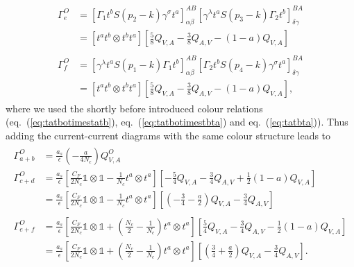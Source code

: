 \begin{align}
		\begin{split}
			\Gamma^O_e &= \left[ \Gamma_1 t^b S(p_2-k) \gamma^\sigma t^a \right]^{AB}_{\alpha\beta} \left[ \gamma^\lambda t^a S(p_3 -k) \Gamma_2 t^b \right]^{BA}_{\delta\gamma} \\
			&= \left[ t^a t^b \otimes t^b t^a \right] \left[\frac{5}{8}Q_{V,A} - \frac{3}{8}Q_{A,V} - (1-a)Q_{V,A}\right] 
		\end{split} \\
		\begin{split}
			\Gamma^O_f &= \left[\gamma^\lambda t^a S(p_1-k) \Gamma_1 t^b \right]^{AB}_{\alpha\beta} \left[ \Gamma_2 t^b S(p_4-k) \gamma^\sigma t^a \right]^{BA}_{\delta\gamma} \\
			&= \left[ t^a t^b \otimes t^b t^a \right] \left[\frac{5}{8}Q_{V,A} - \frac{3}{8}Q_{A,V} - (1-a)Q_{V,A}\right], 
		\end{split} 
	\end{align}
	where we used the shortly before introduced colour relations (eq.~(\ref{eq:tatbotimestatb}), eq.~(\ref{eq:tatbotimestbta}) and eq.~(\ref{eq:tatbta})). Thus adding the current-current diagrams with the same colour structure leads to 
	\begin{align}
		\begin{split}
			\Gamma^O_{a+b} &= \frac{a_s}{\epsilon} \left(-\frac{a}{4N_c}\right) Q^O_{V,A} \\
			\Gamma^O_{c+d} &= \frac{a_s}{\epsilon}\left[\frac{C_F}{2N_c}\mathbb{1}\otimes\mathbb{1} - \frac{1}{N_c}t^a\otimes t^a\right] \left[-\frac{5}{4}Q_{V,A} - \frac{3}{4} Q_{A,V} + \frac{1}{2}(1-a)Q_{V,A} \right] \\
			&= \frac{a_s}{\epsilon} \left[\frac{C_F}{2N_c}\mathbb{1}\otimes\mathbb{1} - \frac{1}{N_c}t^a\otimes t^a\right] \left[\left(-\frac{3}{4}-\frac{a}{2}\right)Q_{V,A} - \frac{3}{4} Q_{A,V} \right] 
		\end{split} \\
		\begin{split}	
			\Gamma^O_{e+f} &= \frac{a_s}{\epsilon} \left[\frac{C_F}{2N_c} \mathbb{1}\otimes\mathbb{1} +\left(\frac{N_c}{2} - \frac{1}{N_c}\right) t^a\otimes t^a\right] \left[\frac{5}{4} Q_{V,A} - \frac{3}{4}Q_{A,V} - \frac{1}{2}(1-a) Q_{V,A} \right] \\
			&= \frac{a_s}{\epsilon} \left[\frac{C_F}{2N_c} \mathbb{1}\otimes\mathbb{1} +\left(\frac{N_c}{2} - \frac{1}{N_c}\right) t^a\otimes t^a\right] \left[\left(\frac{3}{4} + \frac{a}{2}\right) Q_{V,A} - \frac{3}{4}Q_{A,V} \right].
		\end{split}
	\end{align}
